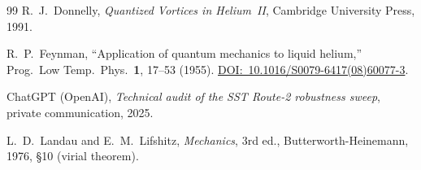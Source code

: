 \documentclass[11pt,a4paper]{article}
\begin{document}
\begin{thebibliography}{99}
R.~J.~Donnelly,
\textit{Quantized Vortices in Helium~II},
Cambridge University Press, 1991.

R.~P.~Feynman,
``Application of quantum mechanics to liquid helium,''
Prog.\ Low Temp.\ Phys.\ \textbf{1}, 17--53 (1955).
\href{https://doi.org/10.1016/S0079-6417(08)60077-3}{DOI:~10.1016/S0079-6417(08)60077-3}.

ChatGPT (OpenAI),
\textit{Technical audit of the SST Route-2 robustness sweep},
private communication, 2025.

L.~D.~Landau and E.~M.~Lifshitz,
\textit{Mechanics}, 3rd ed.,
Butterworth-Heinemann, 1976, \S10 (virial theorem).

\end{thebibliography}
\end{document}

